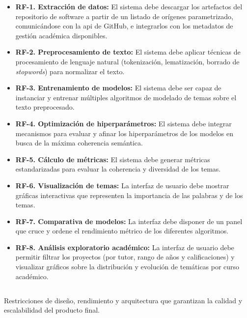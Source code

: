 \begin{itemize}
	\item \textbf{RF-1. Extracción de datos:} El sistema debe descargar los artefactos del repositorio de software a partir de un listado de orígenes parametrizado, comunicándose con la \acrshort{api} de GitHub, e integrarlos con los metadatos de gestión académica disponibles.
	\item \textbf{RF-2. Preprocesamiento de texto:} El sistema debe aplicar técnicas de procesamiento de lenguaje natural (tokenización, lematización, borrado de \textit{stopwords}) para normalizar el texto.
	\item \textbf{RF-3. Entrenamiento de modelos:} El sistema debe ser capaz de instanciar y entrenar múltiples algoritmos de modelado de temas sobre el texto preprocesado.
	\item \textbf{RF-4. Optimización de hiperparámetros:} El sistema debe integrar mecanismos para evaluar y afinar los hiperparámetros de los modelos en busca de la máxima coherencia semántica.
	\item \textbf{RF-5. Cálculo de métricas:} El sistema debe generar métricas estandarizadas para evaluar la coherencia y diversidad de los temas.
	\item \textbf{RF-6. Visualización de temas:} La interfaz de usuario debe mostrar gráficas interactivas que representen la importancia de las palabras y de los temas.
	\item \textbf{RF-7. Comparativa de modelos:} La interfaz debe disponer de un panel que cruce y ordene el rendimiento métrico de los diferentes algoritmos.
	\item \textbf{RF-8. Análisis exploratorio académico:} La interfaz de usuario debe permitir filtrar los proyectos (por tutor, rango de años y calificaciones) y visualizar gráficos sobre la distribución y evolución de temáticas por curso académico.
\end{itemize}

\subsection{}
Restricciones de diseño, rendimiento y arquitectura que garantizan la calidad y
escalabilidad del producto final.


